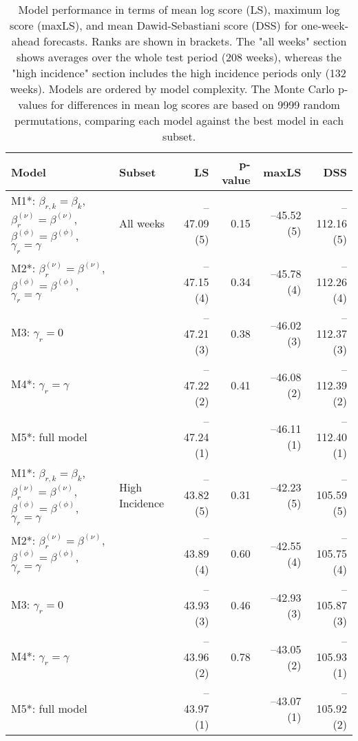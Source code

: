 \begin{table}[ht]
\centering
\begingroup\fontsize{9pt}{10pt}\selectfont
\begin{tabular}{ll|rrrr}
  \hline
Model & Subset & LS & p-value & maxLS & DSS \\ 
  \hline
M1*: $\beta_{r,k} = \beta_{k}$, $\beta_{r}^{(\nu)} = \beta^{(\nu)}$, $\beta^{(\phi)} = \beta^{(\phi)}$, $\gamma_r = \gamma$ & All weeks & --47.09 (5) & 0.15 & --45.52 (5) & --112.16 (5) \\ 
  M2*: $\beta_{r}^{(\nu)} = \beta^{(\nu)}$, $\beta^{(\phi)} = \beta^{(\phi)}$, $\gamma_r = \gamma$ &  & --47.15 (4) & 0.34 & --45.78 (4) & --112.26 (4) \\ 
  M3: $\gamma_r = 0$ &  & --47.21 (3) & 0.38 & --46.02 (3) & --112.37 (3) \\ 
  M4*: $\gamma_r = \gamma$ &  & --47.22 (2) & 0.41 & --46.08 (2) & --112.39 (2) \\ 
  M5*: full model &  & --47.24 (1) &  & --46.11 (1) & --112.40 (1) \\ 
   \hline
M1*: $\beta_{r,k} = \beta_{k}$, $\beta_{r}^{(\nu)} = \beta^{(\nu)}$, $\beta^{(\phi)} = \beta^{(\phi)}$, $\gamma_r = \gamma$ & High Incidence & --43.82 (5) & 0.31 & --42.23 (5) & --105.59 (5) \\ 
  M2*: $\beta_{r}^{(\nu)} = \beta^{(\nu)}$, $\beta^{(\phi)} = \beta^{(\phi)}$, $\gamma_r = \gamma$ &  & --43.89 (4) & 0.60 & --42.55 (4) & --105.75 (4) \\ 
  M3: $\gamma_r = 0$ &  & --43.93 (3) & 0.46 & --42.93 (3) & --105.87 (3) \\ 
  M4*: $\gamma_r = \gamma$ &  & --43.96 (2) & 0.78 & --43.05 (2) & --105.93 (1) \\ 
  M5*: full model &  & --43.97 (1) &  & --43.07 (1) & --105.92 (2) \\ 
   \hline
\end{tabular}
\endgroup
\caption{Model performance in terms of mean log score (LS),
             maximum log score (maxLS), and mean Dawid-Sebastiani score (DSS)
             for one-week-ahead forecasts.
             Ranks are shown in brackets.
             The "all weeks" section shows averages over the
             whole test period (208 weeks),
             whereas the "high incidence" section includes
             the high incidence periods only (132 weeks).
             Models are ordered by model complexity.
             The Monte Carlo p-values for differences in mean log scores
             are based on 9999 random permutations,
             comparing each model against the best model in each subset.} 
\label{tab:forecast}
\end{table}
